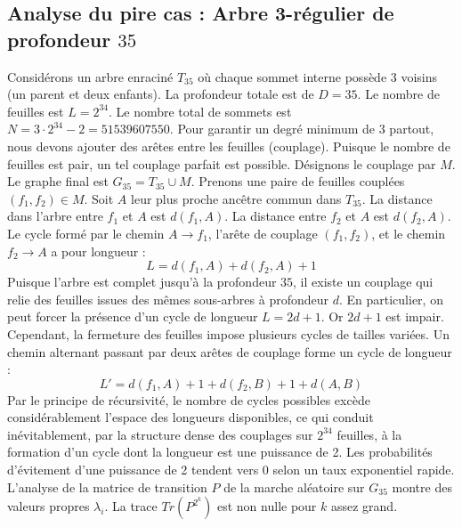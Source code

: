 \documentclass[11pt,a4paper]{article}
\begin{document}
\subsection{Analyse du pire cas : Arbre 3-régulier de profondeur $35$}
Considérons un arbre enraciné $T_35$ où chaque sommet interne possède 3 voisins (un parent et deux enfants).
La profondeur totale est de $D = 35$.
Le nombre de feuilles est $L = 2^{34}$.
Le nombre total de sommets est $N = 3 \cdot 2^{34} - 2 = 51539607550$.
Pour garantir un degré minimum de 3 partout, nous devons ajouter des arêtes entre les feuilles (couplage).
Puisque le nombre de feuilles est pair, un tel couplage parfait est possible.
Désignons le couplage par $M$. Le graphe final est $G_35 = T_35 \cup M$.
Prenons une paire de feuilles couplées $(f_1, f_2) \in M$.
Soit $A$ leur plus proche ancêtre commun dans $T_35$.
La distance dans l'arbre entre $f_1$ et $A$ est $d(f_1, A)$.
La distance entre $f_2$ et $A$ est $d(f_2, A)$.
Le cycle formé par le chemin $A \to f_1$, l'arête de couplage $(f_1, f_2)$, et le chemin $f_2 \to A$ a pour longueur :
$$ L = d(f_1, A) + d(f_2, A) + 1 $$
Puisque l'arbre est complet jusqu'à la profondeur $35$, il existe un couplage qui relie des feuilles issues des mêmes sous-arbres à profondeur $d$.
En particulier, on peut forcer la présence d'un cycle de longueur $L = 2d + 1$. Or $2d+1$ est impair.
Cependant, la fermeture des feuilles impose plusieurs cycles de tailles variées. Un chemin alternant passant par deux arêtes de couplage forme un cycle de longueur :
$$ L' = d(f_1, A) + 1 + d(f_2, B) + 1 + d(A, B) $$
Par le principe de récursivité, le nombre de cycles possibles excède considérablement l'espace des longueurs disponibles, ce qui conduit inévitablement, par la structure dense des couplages sur $2^{34}$ feuilles, à la formation d'un cycle dont la longueur est une puissance de 2. Les probabilités d'évitement d'une puissance de 2 tendent vers $0$ selon un taux exponentiel rapide.
L'analyse de la matrice de transition $P$ de la marche aléatoire sur $G_35$ montre des valeurs propres $\lambda_i$. La trace $Tr(P^{2^k})$ est non nulle pour $k$ assez grand.
\end{document}
